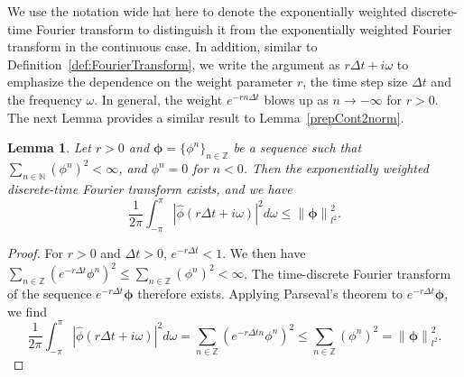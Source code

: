 \documentclass[reqno]{amsart}
\newtheorem{lemma}{Lemma}
\newcommand{\norm}[1]{\left\lVert#1\right\rVert}
\begin{document}
We use the notation wide hat here to denote the exponentially weighted discrete-time Fourier transform to distinguish it from the exponentially weighted Fourier transform in the continuous case. In addition, similar to Definition~\ref{def:FourierTransform}, we write the argument as $r\Delta t + i\omega$ to emphasize the dependence on the weight parameter $r$, the time step size $\Delta t$ and the frequency $\omega$. 
In general, the weight $e^{-rn\Delta t}$ blows up as $n\to -\infty$ for $r>0$. The next Lemma provides a similar result to Lemma~\ref{prepCont2norm}.

\begin{lemma}\label{prepDisc2norm}
Let $r > 0$ and $\boldsymbol{\phi} = \{\phi^n\}_{n\in\mathbb{Z}}$ be a sequence such that $ \sum_{n\in\mathbb{N}} (\phi^n)^2 < \infty$, and $\phi^n=0$ for $n<0$. Then the exponentially weighted discrete-time Fourier transform exists, and we have
\[\frac{1}{2 \pi} \int_{-\pi}^{\pi} |\widehat{\phi}(r\Delta t+i\omega)|^2 d\omega \leq \norm{\boldsymbol{\phi}}_{l^2}^2.\]
\end{lemma}


\begin{proof}
For $r>0$ and $\Delta t> 0$, $e^{-r \Delta t} < 1$. 
We then have $\sum_{n\in\mathbb{Z}}(e^{-r \Delta t} \phi^n)^2 \leq \sum_{n\in\mathbb{Z}} (\phi^n)^2 < \infty$. The time-discrete Fourier transform of the sequence $e^{-r \Delta t } \boldsymbol{\phi}$ therefore exists. Applying Parseval's theorem to $e^{-r \Delta t } \boldsymbol{\phi}$, we find
\[\frac{1}{2\pi} \int_{-\pi}^{\pi} \left|\widehat{\phi}(r \Delta t + i\omega)\right|^2 d \omega= \sum_{n\in\mathbb{Z}} (e^{-r \Delta t n} \phi^{n})^2 \leq \sum_{n\in\mathbb{Z}} (\phi^{n})^2 = \norm{\boldsymbol{\phi}}_{l^2}^2.\]
\end{proof}
\end{document}
